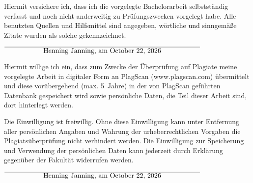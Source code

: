 \documentclass[12pt,oneside,a4paper,parskip]{scrbook}
\def\BaAuthor{Henning Janning}
\begin{document}
\cleardoublepage
{}
{}
\printbibliography



Hiermit versichere ich, dass ich die vorgelegte Bachelorarbeit selbstständig verfasst und noch nicht anderweitig zu Prüfungszwecken vorgelegt habe. Alle benutzten Quellen und Hilfsmittel sind angegeben, wörtliche und sinngemäße Zitate wurden als solche gekennzeichnet.

\vspace{20pt}
\begin{flushright}
$\overline{~~~~~~~~~~~~~~~~~\mbox{\BaAuthor, am \today}~~~~~~~~~~~~~~~~~}$
\end{flushright}


Hiermit willige ich ein, dass zum Zwecke der Überprüfung auf Plagiate meine vorgelegte Arbeit in digitaler Form an PlagScan (www.plagscan.com) übermittelt und diese vorübergehend (max. 5~Jahre) in der von PlagScan geführten Datenbank gespeichert wird sowie persönliche Daten, die Teil dieser Arbeit sind, dort hinterlegt werden.

\begin{small}
Die Einwilligung ist freiwillig. Ohne diese Einwilligung kann unter Entfernung aller persönlichen Angaben und Wahrung der urheberrechtlichen Vorgaben die Plagiatsüberprüfung nicht verhindert werden. Die Einwilligung zur Speicherung und Verwendung der persönlichen Daten kann jederzeit durch Erklärung gegenüber der Fakultät widerrufen werden.
\end{small}

\vspace{20pt}
\begin{flushright}
$\overline{~~~~~~~~~~~~~~~~~\mbox{\BaAuthor, am \today}~~~~~~~~~~~~~~~~~}$
\end{flushright}
\end{document}
